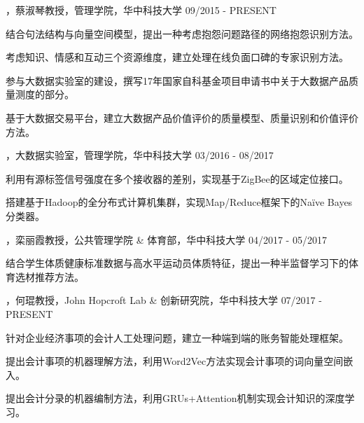 
\begin{cventries}

\cvexperience
{，蔡淑琴教授，管理学院，华中科技大学}
{09/2015 - PRESENT}
{
    \begin{cvitems}
    \item {结合句法结构与向量空间模型，提出一种考虑抱怨问题路径的网络抱怨识别方法。}
    \item {考虑知识、情感和互动三个资源维度，建立处理在线负面口碑的专家识别方法。}
    \item {参与大数据实验室的建设，撰写17年国家自科基金项目申请书中关于大数据产品质量测度的部分。}
    \item {基于大数据交易平台，建立大数据产品价值评价的质量模型、质量识别和价值评价方法。}
    \end{cvitems}
}

\cvexperience
{，大数据实验室，管理学院，华中科技大学}
{03/2016 - 08/2017}
{
    \begin{cvitems}
    \item {利用有源标签信号强度在多个接收器的差别，实现基于ZigBee的区域定位接口。}
    \item {搭建基于Hadoop的全分布式计算机集群，实现Map/Reduce框架下的Naïve Bayes分类器。}
    \end{cvitems}
}

\cvexperience
{，栾丽霞教授，公共管理学院 \& 体育部，华中科技大学}
{04/2017 - 05/2017}
{
    \begin{cvitems}
    \item {结合学生体质健康标准数据与高水平运动员体质特征，提出一种半监督学习下的体育选材推荐方法。}
    \end{cvitems}
}


\cvexperience
{，何琨教授，John Hopcroft Lab \& 创新研究院，华中科技大学}
{07/2017 - PRESENT}
{
    \begin{cvitems}
    \item {针对企业经济事项的会计人工处理问题，建立一种端到端的账务智能处理框架。}
    \item {提出会计事项的机器理解方法，利用Word2Vec方法实现会计事项的词向量空间嵌入。}
    \item {提出会计分录的机器编制方法，利用GRUs+Attention机制实现会计知识的深度学习。}
    \end{cvitems}
}

\end{cventries}